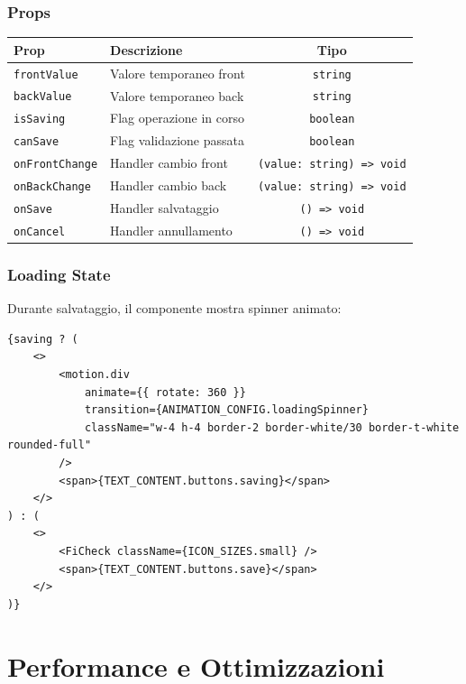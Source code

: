 \documentclass[11pt,a4paper]{article}
\begin{document}
\subsubsection{Props}

\begin{tabularx}{\textwidth}{|l|X|c|}
\hline
\textbf{Prop} & \textbf{Descrizione} & \textbf{Tipo} \\
\hline
\texttt{frontValue} & Valore temporaneo front & \texttt{string} \\
\hline
\texttt{backValue} & Valore temporaneo back & \texttt{string} \\
\hline
\texttt{isSaving} & Flag operazione in corso & \texttt{boolean} \\
\hline
\texttt{canSave} & Flag validazione passata & \texttt{boolean} \\
\hline
\texttt{onFrontChange} & Handler cambio front & \texttt{(value: string) => void} \\
\hline
\texttt{onBackChange} & Handler cambio back & \texttt{(value: string) => void} \\
\hline
\texttt{onSave} & Handler salvataggio & \texttt{() => void} \\
\hline
\texttt{onCancel} & Handler annullamento & \texttt{() => void} \\
\hline
\end{tabularx}

\subsubsection{Loading State}

Durante salvataggio, il componente mostra spinner animato:

\begin{lstlisting}[style=typescript, caption=Loading Spinner]
{saving ? (
    <>
        <motion.div
            animate={{ rotate: 360 }}
            transition={ANIMATION_CONFIG.loadingSpinner}
            className="w-4 h-4 border-2 border-white/30 border-t-white rounded-full"
        />
        <span>{TEXT_CONTENT.buttons.saving}</span>
    </>
) : (
    <>
        <FiCheck className={ICON_SIZES.small} />
        <span>{TEXT_CONTENT.buttons.save}</span>
    </>
)}
\end{lstlisting}


\section{Performance e Ottimizzazioni}
\end{document}
